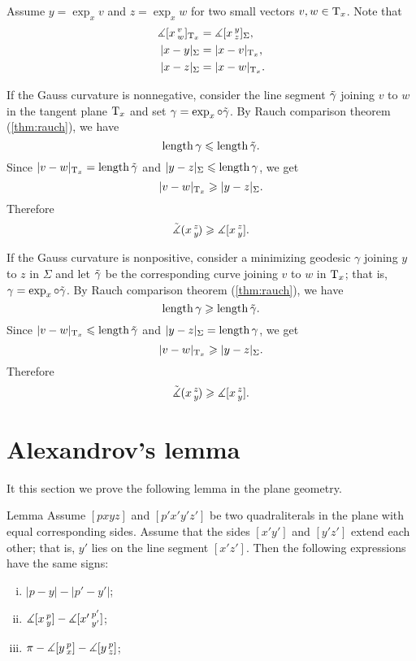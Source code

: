 Assume $y=\exp_xv$ and $z=\exp_xw$ for two small vectors $v,w\in\T_x$.
Note that 
\begin{align*}
\measuredangle \hinge xvw_{\T_x}&=\measuredangle \hinge xyz_\Sigma,
\\
|x-y|_\Sigma&=|x-v|_{\T_x}, 
\\
|x-z|_\Sigma&=|x-w|_{\T_x}.
\end{align*}


If the Gauss curvature is nonnegative,
consider the line segment $\~\gamma$ joining $v$ to $w$ in the tangent plane $\T_x$ and set $\gamma=\exp_x\circ\~\gamma$.
By Rauch comparison theorem (\ref{thm:rauch}), we have
\[\length\gamma\le \length \~\gamma.\]
Since $|v-w|_{\T_x}=\length\~\gamma$ and $|y-z|_{\Sigma}\le \length\gamma$, we get 
\[|v-w|_{\T_x}\ge |y-z|_\Sigma.\]
Therefore
\[\angk xzy\ge \measuredangle\hinge xzy.\]

If the Gauss curvature is nonpositive,
consider a minimizing geodesic $\gamma$ joining $y$ to $z$ in $\Sigma$ and let $\~\gamma$ be the corresponding curve joining $v$ to $w$ in $\T_x$; that is,  $\gamma=\exp_x\circ\~\gamma$.
By Rauch comparison theorem (\ref{thm:rauch}), we have
\[\length\gamma\ge \length \~\gamma.\]
Since $|v-w|_{\T_x}\le\length\~\gamma$ and $|y-z|_{\Sigma}= \length\gamma$, we get 
\[|v-w|_{\T_x}\ge |y-z|_\Sigma.\]
Therefore
\[\angk xzy\ge \measuredangle\hinge xzy.\]
\qedsf

\section{Alexandrov's lemma}

It this section we prove the following lemma in the plane geometry.

\begin{thm}{Lemma}
\label{lem:alex}
Assume $[pxyz]$ and $[p'x'y'z']$ be two quadraliterals in the plane with equal corresponding sides.
Assume that the sides $[x'y']$ and $[y'z']$ extend each other; that is, $y'$ lies on the line segment $[x'z']$.
Then the following expressions have the same signs:
\begin{enumerate}[(i)]
 \item $|p-y|-|p'-y'|$;
 \item $\measuredangle\hinge xpy-\measuredangle\hinge {x'}{p'}{y'}$;
 \item $\pi-\measuredangle\hinge ypx-\measuredangle\hinge ypz$;
\end{enumerate}
\end{thm}

